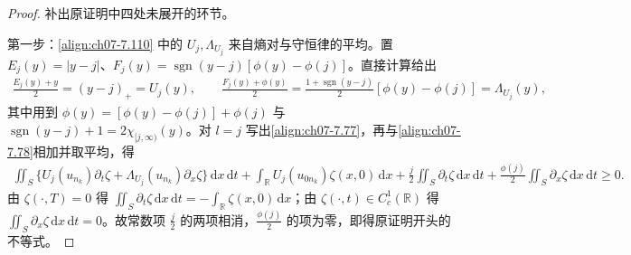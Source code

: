 \documentclass[../../main.tex]{subfiles}%
\begin{document}
\begin{proof}
补出原证明中四处未展开的环节。

第一步：\eqref{align:ch07-7.110} 中的 $U_j,\Lambda_{U_j}$ 来自熵对与守恒律的平均。置 $E_j(y)=|y-j|$、$F_j(y)=\operatorname{sgn}(y-j)[\phi(y)-\phi(j)]$。直接计算给出
\begin{align*}
\frac{E_j(y)+y}{2}=(y-j)_+=U_j(y),\qquad
\frac{F_j(y)+\phi(y)}{2}=\frac{1+\operatorname{sgn}(y-j)}{2}[\phi(y)-\phi(j)]=\Lambda_{U_j}(y),
\end{align*}
其中用到 $\phi(y)=[\phi(y)-\phi(j)]+\phi(j)$ 与 $\operatorname{sgn}(y-j)+1=2\chi_{[j,\infty)}(y)$。对 $l=j$ 写出\eqref{align:ch07-7.77}，再与\eqref{align:ch07-7.78}相加并取平均，得
\begin{align*}
\iint_S\{U_j(u_{n_k})\partial_t\zeta+\Lambda_{U_j}(u_{n_k})\partial_x\zeta\}\,\mathrm{d}x\,\mathrm{d}t
+\int_{\mathbb{R}}U_j(u_{0n_k})\zeta(x,0)\,\mathrm{d}x
+\frac{j}{2}\iint_S\partial_t\zeta\,\mathrm{d}x\,\mathrm{d}t+\frac{\phi(j)}{2}\iint_S\partial_x\zeta\,\mathrm{d}x\,\mathrm{d}t\geqslant0.
\end{align*}
由 $\zeta(\cdot,T)=0$ 得 $\iint_S\partial_t\zeta\,\mathrm{d}x\,\mathrm{d}t=-\int_{\mathbb{R}}\zeta(x,0)\,\mathrm{d}x$；由 $\zeta(\cdot,t)\in C^1_c(\mathbb{R})$ 得 $\iint_S\partial_x\zeta\,\mathrm{d}x\,\mathrm{d}t=0$。故常数项 $\frac{j}{2}$ 的两项相消，$\frac{\phi(j)}{2}$ 的项为零，即得原证明开头的不等式。


\end{proof}
\end{document}
